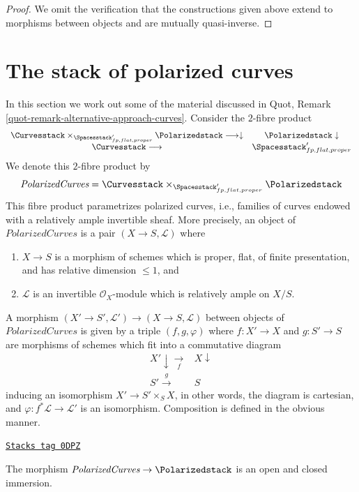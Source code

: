 \begin{proof}
\medskip\noindent
We omit the verification that the constructions given above
extend to morphisms between objects and are mutually quasi-inverse.
\end{proof}

\section{The stack of polarized curves}
\label{moduli-curves-section-polarized-curves}
In this section we work out some of the material
discussed in Quot, Remark \ref{quot-remark-alternative-approach-curves}.
Consider the $2$-fibre product
$$
\begin{array}{cc}\Curvesstack \times_{\Spacesstack'_{fp, flat, proper}}
\Polarizedstack \longrightarrow\downarrow & \Polarizedstack \downarrow \\ \Curvesstack \longrightarrow & \Spacesstack'_{fp, flat, proper}\end{array}
$$
We denote this $2$-fibre product by
$$
\textit{PolarizedCurves} =
\Curvesstack
\times_{\Spacesstack'_{fp, flat, proper}}
\Polarizedstack
$$
This fibre product parametrizes polarized curves, i.e., families
of curves endowed with a relatively ample invertible sheaf.
More precisely, an object of
$\textit{PolarizedCurves}$
is a pair $(X \to S, \mathcal{L})$ where
\begin{enumerate}
\item $X \to S$ is a morphism of schemes which is proper, flat,
of finite presentation, and has relative dimension $\leq 1$, and
\item $\mathcal{L}$ is an invertible $\mathcal{O}_X$-module
which is relatively ample on $X/S$.
\end{enumerate}
A morphism $(X' \to S', \mathcal{L}') \to (X \to S, \mathcal{L})$
between objects of
$\textit{PolarizedCurves}$
is given by a triple $(f, g, \varphi)$
where $f : X' \to X$ and $g : S' \to S$
are morphisms of schemes which fit into a commutative diagram
$$
\begin{array}{cc}X' \downarrow\underset{f}{\longrightarrow} & X \downarrow \\ S' \overset{g}{\longrightarrow} & S\end{array}
$$
inducing an isomorphism $X' \to S' \times_S X$, in other words, the
diagram is cartesian, and $\varphi : f^*\mathcal{L} \to \mathcal{L}'$
is an isomorphism. Composition is defined in the obvious manner.

\begin{lemma}
\label{moduli-curves-lemma-polarized-curves-in-polarized}
\href{https://stacks.math.columbia.edu/tag/0DPZ}{\texttt{Stacks tag 0DPZ}}

The morphism
$\textit{PolarizedCurves} \to
\Polarizedstack$ is an open and closed immersion.
\end{lemma}

